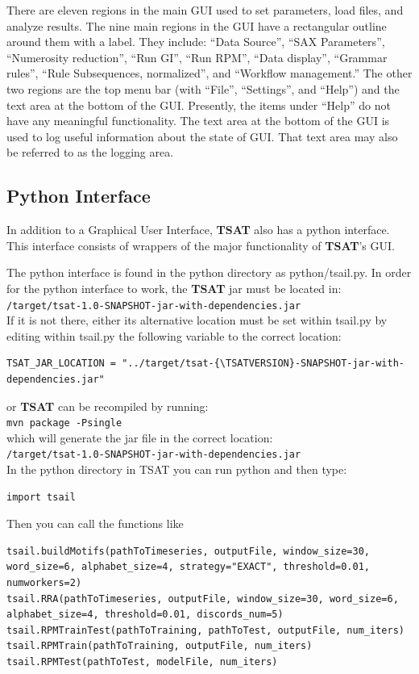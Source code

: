 \documentclass[titlepage, letterpaper, 12pt]{article}
\newcommand\TSAT{\textbf{TSAT}}
\newcommand\TSATVERSION{1.0}
\begin{document}
There are eleven regions in the main GUI used to set parameters, load files, and analyze results.  The nine main regions in the GUI have a rectangular outline around them with a label.  They include: ``Data Source'', ``SAX Parameters'', ``Numerosity reduction'', ``Run GI'', ``Run RPM'', ``Data display'', ``Grammar rules'', ``Rule Subsequences, normalized'', and ``Workflow management.''  The other two regions are the top menu bar (with ``File'', ``Settings'', and ``Help'') and the text area at the bottom of the GUI.  Presently, the items under ``Help'' do not have any meaningful functionality.  The text area at the bottom of the GUI is used to log useful information about the state of GUI.  That text area may also be referred to as the logging area.
 
\subsection{Python Interface}
\label{introPython}
In addition to a Graphical User Interface, {\TSAT} also has a python interface.  This interface consists of wrappers of the major functionality of {\TSAT}'s GUI. 

The python interface is found in the python directory as python/tsail.py.  In order for the python interface to work, the {\TSAT} jar must be located in:\\ \texttt{/target/tsat-{\TSATVERSION}-SNAPSHOT-jar-with-dependencies.jar}\\
If it is not there, either its alternative location must be set within tsail.py by editing within tsail.py the following variable to the correct location:
\begin{lstlisting}
TSAT_JAR_LOCATION = "../target/tsat-{\TSATVERSION}-SNAPSHOT-jar-with-dependencies.jar"
\end{lstlisting} 
or {\TSAT} can be recompiled by running:\\
\noindent\texttt{mvn package -Psingle}\\
which will generate the jar file in the correct location:\\
\texttt{/target/tsat-{\TSATVERSION}-SNAPSHOT-jar-with-dependencies.jar}\\
In the python directory in TSAT you can run python and then type:
\begin{lstlisting}
import tsail
\end{lstlisting}

Then you can call the functions like
\begin{lstlisting}
tsail.buildMotifs(pathToTimeseries, outputFile, window_size=30, word_size=6, alphabet_size=4, strategy="EXACT", threshold=0.01, numworkers=2)
tsail.RRA(pathToTimeseries, outputFile, window_size=30, word_size=6, alphabet_size=4, threshold=0.01, discords_num=5)
tsail.RPMTrainTest(pathToTraining, pathToTest, outputFile, num_iters)
tsail.RPMTrain(pathToTraining, outputFile, num_iters)
tsail.RPMTest(pathToTest, modelFile, num_iters)
\end{lstlisting}
\end{document}
